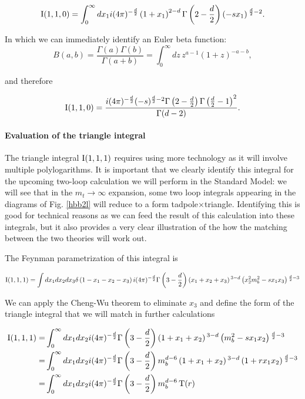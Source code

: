 \begin{equation}
\text{I}(1,1,0) = \int_0^\infty dx_1 i (4 \pi )^{-\frac{d}{2}} \left(1+x_1\right)^{2-d} \Gamma \left(2-\frac{d}{2}\right) \left(-s x_1\right){}^{\frac{d}{2}-2}.
\end{equation}

In which we can immediately identify an Euler beta function:
\begin{equation}
B(a,b)=\frac{\Gamma(a)\Gamma(b)}{ \Gamma(a+b) } = \int_0^\infty dz\, z^{a-1}(1+z)^{-a-b},
\end{equation}

and therefore

\begin{equation}
  \text{I}(1,1,0)=\frac{i (4 \pi )^{-\frac{d}{2}} (-s)^{\frac{d}{2}-2} \Gamma \left(2-\frac{d}{2}\right) \Gamma \left(\frac{d}{2}-1\right)^2}{\Gamma (d-2)}.
\end{equation}

\paragraph{Evaluation of the triangle integral}

The triangle integral $\text{I}(1,1,1)$ requires using more technology as it will involve multiple polylogarithms. It is important that we clearly identify this integral for the upcoming two-loop calculation we will perform in the Standard Model: we will see that in the $m_t\to\infty$ expansion, some two loop integrals appearing in the diagrams of Fig. \ref{hbb2l} will reduce to a form tadpole$\times$triangle. Identifying this is good for technical reasons as we can feed the result of this calculation into these integrals, but it also provides a very clear illustration of the how the matching between the two theories will work out.

The Feynman parametrization of this integral is

\begin{equation}
\text{I}(1,1,1)=\int dx_1dx_2dx_3 \delta \left( 1-x_1-x_2-x_3 \right) i (4 \pi )^{-\frac{d}{2}} \Gamma \left(3-\frac{d}{2}\right) \left(x_1+x_2+x_3\right){}^{3-d} \left(x_2^2 m_b^2-s x_1 x_3\right){}^{\frac{d}{2}-3}
\end{equation}

We can apply the Cheng-Wu theorem to eliminate $x_3$ and define the form of the triangle integral that we will match in further calculations

\begin{equation}
\begin{split}
\text{I}(1,1,1)=&\int_0^\infty dx_1dx_2 i (4 \pi )^{-\frac{d}{2}} \Gamma \left(3-\frac{d}{2}\right) \left(1+x_1+x_2\right){}^{3-d}  \left(m_b^2-s x_1 x_2\right){}^{\frac{d}{2}-3}\\
=& \int_0^\infty dx_1dx_2 i (4 \pi )^{-\frac{d}{2}}  \Gamma \left(3-\frac{d}{2}\right) m_b^{d-6} \left(1+x_1+x_2\right){}^{3-d} \left(1+r x_1 x_2\right){}^{\frac{d}{2}-3}\\
=& \int_0^\infty dx_1dx_2 i (4 \pi )^{-\frac{d}{2}}  \Gamma \left(3-\frac{d}{2}\right) m_b^{d-6} \,\text{T}(r)
\end{split}
\end{equation}

